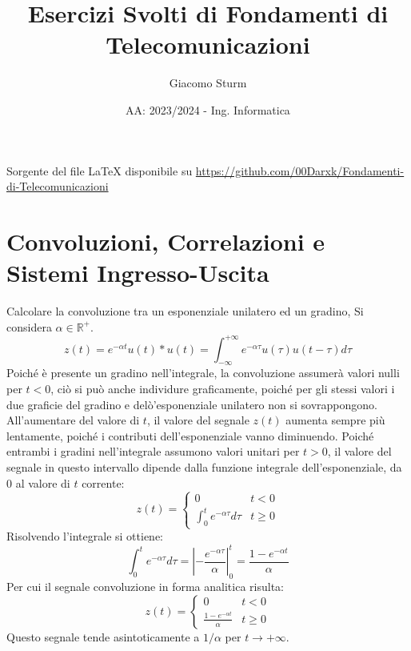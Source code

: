 \documentclass{article}
\title{Esercizi Svolti di Fondamenti di Telecomunicazioni}
\author{Giacomo Sturm}
\date{AA: 2023/2024 - Ing. Informatica}
\begin{document}

\pagestyle{fancy}
\fancyhead{}\fancyfoot{}
\fancyfoot[C]{\thepage}

\maketitle

\vspace{10mm}

\begin{center}
    Sorgente del file LaTeX disponibile su \url{https://github.com/00Darxk/Fondamenti-di-Telecomunicazioni}
\end{center}

\clearpage

\tableofcontents

\clearpage


\section{Convoluzioni, Correlazioni e Sistemi Ingresso-Uscita}

Calcolare la convoluzione tra un esponenziale unilatero ed un gradino, 
Si considera $\alpha\in\mathbb{R}^+$. 
\begin{equation*}
    z(t)=e^{-\alpha t}u(t)*u(t)=\displaystyle\int_{-\infty}^{+\infty}e^{-\alpha\tau}u(\tau)u(t-\tau)d\tau
\end{equation*}
Poiché è presente un gradino nell'integrale, la convoluzione assumerà valori nulli per $t<0$, ciò si può anche individure graficamente, poiché per gli stessi valori i due 
graficie del gradino e delò'esponenziale unilatero non si sovrappongono. All'aumentare del valore di $t$, il valore del segnale $z(t)$ aumenta sempre più lentamente, poiché i 
contributi dell'esponenziale vanno diminuendo. Poiché entrambi i gradini nell'integrale assumono valori unitari per $t>0$, il valore del segnale in questo intervallo 
dipende dalla funzione integrale dell'esponenziale, da $0$ al valore di $t$ corrente:
\begin{equation*}
    z(t)=\begin{cases}
        0&t<0\\
        \displaystyle\int_0^te^{-\alpha \tau}d\tau&t\geq0
    \end{cases}
\end{equation*}
Risolvendo l'integrale si ottiene:
\begin{equation*}
    \displaystyle\int_0^te^{-\alpha \tau}d\tau=\left|-\frac{e^{-\alpha\tau}}{\alpha}\right|^t_0=\frac{1-e^{-\alpha t}}{\alpha}
\end{equation*}
Per cui il segnale convoluzione in forma analitica risulta:
\begin{equation}
    z(t)=\begin{cases}
        0&t<0\\
        \displaystyle\frac{1-e^{-\alpha t}}{\alpha}&t\geq0
    \end{cases}
\end{equation}
Questo segnale tende asintoticamente a $1/\alpha$ per $t\to+\infty$. 
\end{document}
